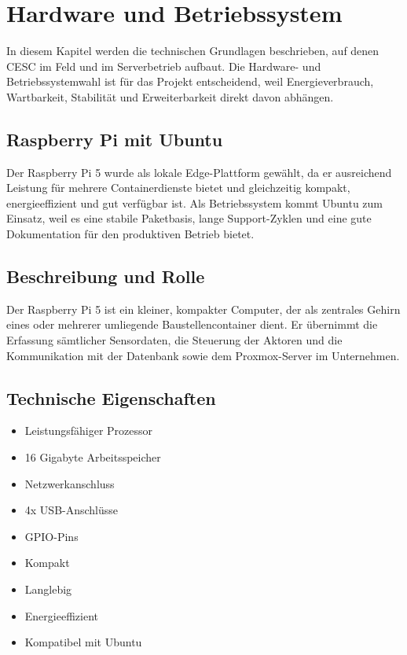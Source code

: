 \section{Hardware und Betriebssystem}

In diesem Kapitel werden die technischen Grundlagen beschrieben, auf denen CESC im Feld und im Serverbetrieb aufbaut. Die Hardware- und Betriebssystemwahl ist für das Projekt entscheidend, weil Energieverbrauch, Wartbarkeit, Stabilität und Erweiterbarkeit direkt davon abhängen.

\subsection{Raspberry Pi mit Ubuntu}

Der Raspberry Pi 5 wurde als lokale Edge-Plattform gewählt, da er ausreichend Leistung für mehrere Containerdienste bietet und gleichzeitig kompakt, energieeffizient und gut verfügbar ist. Als Betriebssystem kommt Ubuntu zum Einsatz, weil es eine stabile Paketbasis, lange Support-Zyklen und eine gute Dokumentation für den produktiven Betrieb bietet.

\subsection{Beschreibung und Rolle}
Der Raspberry Pi 5 ist ein kleiner, kompakter Computer, der als zentrales Gehirn eines oder mehrerer umliegende Baustellencontainer dient. Er übernimmt die Erfassung sämtlicher Sensordaten, die Steuerung der Aktoren und die Kommunikation mit der Datenbank sowie dem Proxmox-Server im Unternehmen.


\subsection{Technische Eigenschaften}
\begin{itemize}
    \item Leistungsfähiger Prozessor 
    \item 16 Gigabyte Arbeitsspeicher
    \item Netzwerkanschluss
    \item 4x USB-Anschlüsse
    \item GPIO-Pins
    \item Kompakt
    \item Langlebig
    \item Energieeffizient
    \item Kompatibel mit Ubuntu
\end{itemize}

